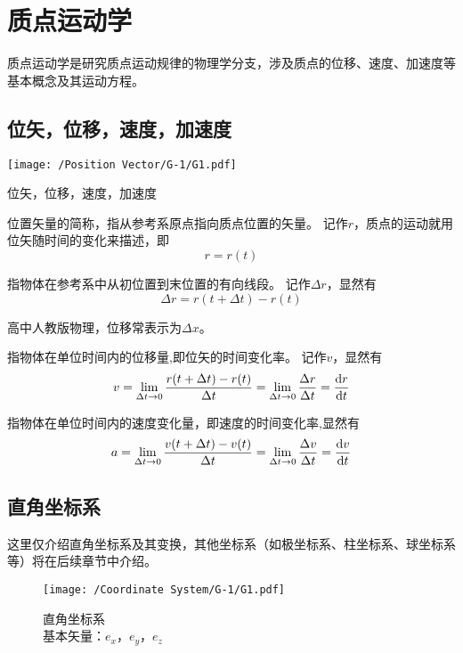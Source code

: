 \chapter{质点运动学}
质点运动学是研究质点运动规律的物理学分支，涉及质点的位移、速度、加速度等基本概念及其运动方程。



\section{位矢，位移，速度，加速度}

\begin{marginfigure}[4.5cm]
    \texttt{[image: /Position Vector/G-1/G1.pdf]}
    \caption[Position vector]{
        位矢，位移，速度，加速度\\
        }
    \label{fig:Position Vector_G1}
\end{marginfigure}

位置矢量的简称，指从参考系原点指向质点位置的矢量。
记作$r$，质点的运动就用位矢随时间的变化来描述，即
$$
r = r(t)
$$

指物体在参考系中从初位置到末位置的有向线段。
记作$\Delta r$，显然有
$$
\Delta r = r(t+\Delta t) - r(t)
$$

{\small
高中人教版物理，位移常表示为$\Delta x$。
}
\vspace{1em}

指物体在单位时间内的位移量,即位矢的时间变化率。
记作$v$，显然有
$$
v = \lim_{\Delta t \to 0} \frac{r(t+\Delta t) - r(t)}{\Delta t}
= \lim_{\Delta t \to 0} \frac{\Delta r}{\Delta t}
= \frac{\textup{d} r}{\textup{d}t}
$$

指物体在单位时间内的速度变化量，即速度的时间变化率,显然有
$$
a = \lim_{\Delta t \to 0} \frac{v(t+\Delta t) - v(t)}{\Delta t}
= \lim_{\Delta t \to 0} \frac{\Delta v}{\Delta t}
= \frac{\textup{d} v}{\textup{d}t}
$$



\section{直角坐标系}
这里仅介绍直角坐标系及其变换，其他坐标系（如极坐标系、柱坐标系、球坐标系等）将在后续章节中介绍。
\begin{figure}
    \texttt{[image: /Coordinate System/G-1/G1.pdf]}
    \caption[Cartesian coordinate system]{
        直角坐标系\\
        \vspace{2cm}
        \normalsize
        基本矢量：${e}_x$，${e}_y$，${e}_z$
        }
    \label{fig:Coordinate System_G1}
\end{figure}


